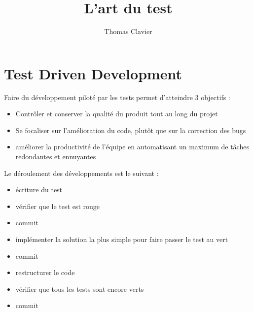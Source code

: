 \documentclass[a4paper]{article}
\title{L'art du test}
\author{Thomas Clavier}
\date{}
\begin{document}
\maketitle

\section*{Test Driven Development}

Faire du développement piloté par les tests permet d'atteindre 3 objectifs :

\begin{itemize}
\item Contrôler et conserver la qualité du produit tout au long du projet
\item Se focaliser sur l'amélioration du code, plutôt que sur la correction des bugs
\item améliorer la productivité de l'équipe en automatisant un maximum de tâches redondantes et ennuyantes
\end{itemize}

Le déroulement des développements est le suivant :
\begin{itemize}
  \item écriture du test
  \item vérifier que le test est rouge
  \item commit
  \item implémenter la solution la plus simple pour faire passer le test au vert
  \item commit
  \item restructurer le code
  \item vérifier que tous les tests sont encore verts
  \item commit 
\end{itemize}

\begin{center}
\end{center}
\end{document}
